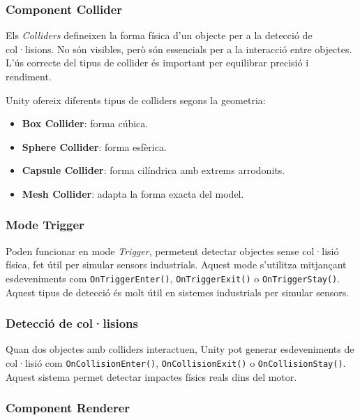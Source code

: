 \documentclass[a4paper,11pt,DIV=13,headings=normal,abstract=true,twoside=semi]{article}
\begin{document}
\subsubsection{Component Collider}

Els \textit{Colliders} \cite{UnityColliders} defineixen la forma física d'un objecte per a la detecció de col·lisions. No són visibles, però són essencials per a la interacció entre objectes. L'ús correcte del tipus de collider és important per equilibrar precisió i rendiment.


Unity ofereix diferents tipus de colliders segons la geometria:

\begin{itemize}
\item \textbf{Box Collider}: forma cúbica.
\item \textbf{Sphere Collider}: forma esfèrica.
\item \textbf{Capsule Collider}: forma cilíndrica amb extrems arrodonits.
\item \textbf{Mesh Collider}: adapta la forma exacta del model.
\end{itemize}

\subsubsection*{Mode Trigger}

Poden funcionar en mode \textit{Trigger}, permetent detectar objectes sense col·lisió física, fet útil per simular sensors industrials. Aquest mode s'utilitza mitjançant esdeveniments com \texttt{OnTriggerEnter()}, \texttt{OnTriggerExit()} o \texttt{OnTriggerStay()}. Aquest tipus de detecció és molt útil en sistemes industrials per simular sensors.

\subsubsection*{Detecció de col·lisions}

Quan dos objectes amb colliders interactuen, Unity pot generar esdeveniments de col·lisió com \texttt{OnCollisionEnter()}, \texttt{OnCollisionExit()} o \texttt{OnCollisionStay()}. Aquest sistema permet detectar impactes físics reals dins del motor.


\subsubsection{Component Renderer}
\end{document}
